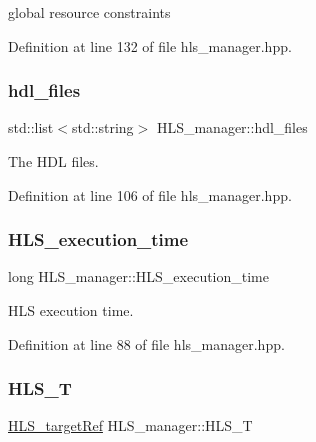 global resource constraints 



Definition at line 132 of file hls\+\_\+manager.\+hpp.

\mbox{\label{classHLS__manager_aa9cb0d2a7ccfcbfd7cf33b4e195752ed}} 
\subsubsection{\texorpdfstring{hdl\+\_\+files}{hdl\_files}}
{\footnotesize\ttfamily std\+::list$<$std\+::string$>$ H\+L\+S\+\_\+manager\+::hdl\+\_\+files}



The H\+DL files. 



Definition at line 106 of file hls\+\_\+manager.\+hpp.

\mbox{\label{classHLS__manager_a0f5b6cd7a1597845253492c70ab321f7}} 
\subsubsection{\texorpdfstring{H\+L\+S\+\_\+execution\+\_\+time}{HLS\_execution\_time}}
{\footnotesize\ttfamily long H\+L\+S\+\_\+manager\+::\+H\+L\+S\+\_\+execution\+\_\+time}



H\+LS execution time. 



Definition at line 88 of file hls\+\_\+manager.\+hpp.

\mbox{\label{classHLS__manager_ac138185e1aa74471d0a571287a60870b}} 
\subsubsection{\texorpdfstring{H\+L\+S\+\_\+T}{HLS\_T}}
{\footnotesize\ttfamily \hyperlink{hls__target_8hpp_a390f1d55d3b31739665ff2776abe2a3f}{H\+L\+S\+\_\+target\+Ref} H\+L\+S\+\_\+manager\+::\+H\+L\+S\+\_\+T\hspace{0.3cm}{\ttfamily [private]}}



